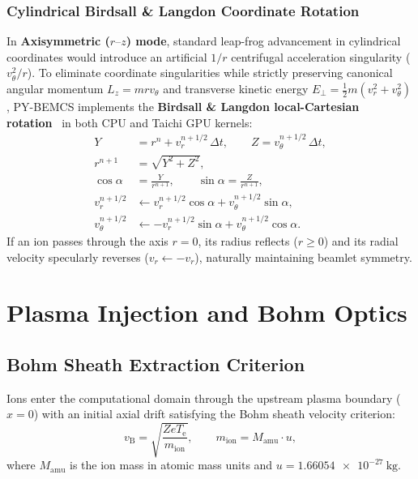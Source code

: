 \documentclass[11pt,a4paper]{article}
\newcommand{\PYBEMCS}{PY-BEMCS}
\begin{document}
\subsubsection{Cylindrical Birdsall \& Langdon Coordinate Rotation}
In \textbf{Axisymmetric ($r\text{--}z$) mode}, standard leap-frog advancement in cylindrical coordinates would introduce an artificial $1/r$ centrifugal acceleration singularity ($v_\theta^2 / r$). To eliminate coordinate singularities while strictly preserving canonical angular momentum $L_z = m r v_\theta$ and transverse kinetic energy $E_\perp = \frac{1}{2}m(v_r^2 + v_\theta^2)$, \PYBEMCS{} implements the \textbf{Birdsall \& Langdon local-Cartesian rotation}~\cite{birdsall} in both CPU and Taichi GPU kernels:
\begin{align}
    Y &= r^n + v_r^{n+1/2}\,\Delta t, \qquad Z = v_\theta^{n+1/2}\,\Delta t,\\
    r^{n+1} &= \sqrt{Y^2 + Z^2},\\
    \cos\alpha &= \frac{Y}{r^{n+1}}, \qquad \sin\alpha = \frac{Z}{r^{n+1}},\\
    v_r^{n+1/2} &\leftarrow v_r^{n+1/2} \cos\alpha + v_\theta^{n+1/2} \sin\alpha,\\
    v_\theta^{n+1/2} &\leftarrow -v_r^{n+1/2} \sin\alpha + v_\theta^{n+1/2} \cos\alpha.
\end{align}
If an ion passes through the axis $r = 0$, its radius reflects ($r \ge 0$) and its radial velocity specularly reverses ($v_r \leftarrow -v_r$), naturally maintaining beamlet symmetry.

\section{Plasma Injection and Bohm Optics}

\subsection{Bohm Sheath Extraction Criterion}

Ions enter the computational domain through the upstream plasma boundary ($x = 0$) with an initial axial drift satisfying the Bohm sheath velocity criterion:
\begin{equation}
    v_{\mathrm{B}} = \sqrt{\frac{Z e T_{\mathrm{e}}}{m_{\mathrm{ion}}}}, \qquad
    m_{\mathrm{ion}} = M_{\mathrm{amu}} \cdot u,
    \label{eq:bohm}
\end{equation}
where $M_{\mathrm{amu}}$ is the ion mass in atomic mass units and $u = \SI{1.66054e-27}{\kilo\gram}$.
\end{document}
